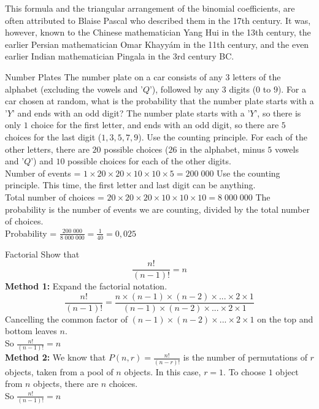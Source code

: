 {This formula and the triangular arrangement of the binomial coefficients, are often attributed to Blaise Pascal who described them in the 17th century. It was, however, known to the Chinese mathematician Yang Hui in the 13th century, the earlier Persian mathematician Omar Khayyám in the 11th century, and the even earlier Indian mathematician Pingala in the 3rd century BC.

}

\begin{wex}{Number Plates}
{The number plate on a car consists of any $3$ letters of the alphabet (excluding the vowels and '$Q$'), followed by any $3$ digits ($0$ to $9$). For a car chosen at random, what is the probability that the number plate starts with a '$Y$' and ends with an odd digit?}
{
 The number plate starts with a '$Y$', so there is only $1$ choice for the first letter, and ends with an odd digit, so there are $5$ choices for the last digit ($1, 3, 5, 7, 9$).
Use the counting principle. For each of the other letters, there are $20$ possible choices ($26$ in the alphabet, minus $5$ vowels and '$Q$') and $10$ possible choices for each of the other digits.\\ Number of events = $1 \times 20 \times 20 \times 10 \times 10 \times 5 = 200\;000$
Use the counting principle. This time, the first letter and last digit can be anything.\\
Total number of choices = $20 \times 20 \times 20 \times 10 \times 10 \times 10 = 8\;000\;000$
 The probability is the number of events we are counting, divided by the total number of choices.\\
Probability = $\frac{200\;000}{8\;000\;000} = \frac{1}{40} = 0,025$
}
\end{wex}

\begin{wex}{Factorial}
{Show that $$\frac{n!}{(n-1)!} = n$$}
{
\textbf{Method 1:} Expand the factorial notation.
$$\frac{n!}{(n-1)!}  =  \frac{n \times (n-1) \times (n-2) \times ... \times 2 \times 1}{(n-1) \times (n-2) \times ... \times 2 \times 1}$$
Cancelling the common factor of $(n-1) \times (n-2) \times ... \times 2 \times 1$ on the top and bottom leaves $n$.\\
So $\frac{n!}{(n-1)!} = n$\\

\textbf{Method 2:}
We know that $P(n,r) = \frac{n!}{(n-r)!}$ is the number of permutations of $r$ objects, taken from a pool of $n$ objects. In this case, $r=1$. To choose $1$ object from $n$ objects, there are $n$ choices.\\
So $\frac{n!}{(n-1)!} = n$\\

}
\end{wex}

